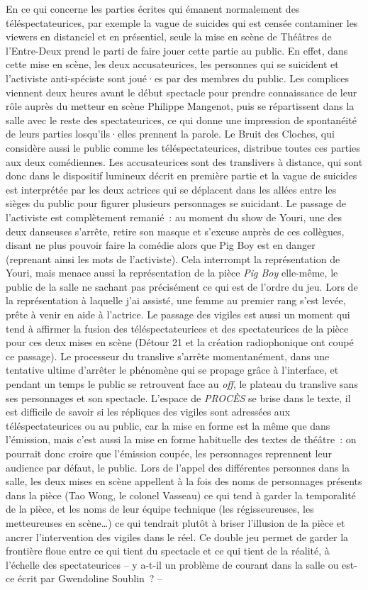 \documentclass[
]{article}
\begin{document}
En ce qui concerne les parties écrites qui émanent normalement des téléspectateurices, par exemple la vague de suicides qui est censée contaminer les viewers en distanciel et en présentiel, seule la mise en scène de Théâtres de l'Entre-Deux prend le parti de faire jouer cette partie au public. En effet, dans cette mise en scène, les deux accusateurices, les personnes qui se suicident et l'activiste anti-spéciste sont joué·es par des membres du public. Les complices viennent deux heures avant le début spectacle pour prendre connaissance de leur rôle auprès du metteur en scène Philippe Mangenot, puis se répartissent dans la salle avec le reste des spectateurices, ce qui donne une impression de spontanéité de leurs parties losqu'ils·elles prennent la parole. Le Bruit des Cloches, qui considère aussi le public comme les téléspectateurices, distribue toutes ces parties aux deux comédiennes. Les accusateurices sont des translivers à distance, qui sont donc dans le dispositif lumineux décrit en première partie et la vague de suicides est interprétée par les deux actrices qui se déplacent dans les allées entre les sièges du public pour figurer plusieurs personnages se suicidant. Le passage de l'activiste est complètement remanié~: au moment du show de Youri, une des deux danseuses s'arrête, retire son masque et s'excuse auprès de ces collègues, disant ne plus pouvoir faire la comédie alors que Pig Boy est en danger (reprenant ainsi les mots de l'activiste). Cela interrompt la représentation de Youri, mais menace aussi la représentation de la pièce \emph{Pig Boy} elle-même, le public de la salle ne sachant pas précisément ce qui est de l'ordre du jeu. Lors de la représentation à laquelle j'ai assisté, une femme au premier rang s'est levée, prête à venir en aide à l'actrice. Le passage des vigiles est aussi un moment qui tend à affirmer la fusion des téléspectateurices et des spectateurices de la pièce pour ces deux mises en scène (Détour 21 et la création radiophonique ont coupé ce passage). Le processeur du translive s'arrête momentanément, dans une tentative ultime d'arrêter le phénomène qui se propage grâce à l'interface, et pendant un temps le public se retrouvent face au \emph{off}, le plateau du translive sans ses personnages et son spectacle. L'espace de \emph{PROCÈS} se brise dans le texte, il est difficile de savoir si les répliques des vigiles sont adressées aux téléspectateurices ou au public, car la mise en forme est la même que dans l'émission, mais c'est aussi la mise en forme habituelle des textes de théâtre~: on pourrait donc croire que l'émission coupée, les personnages reprennent leur audience par défaut, le public. Lors de l'appel des différentes personnes dans la salle, les deux mises en scène appellent à la fois des noms de personnages présents dans la pièce (Tao Wong, le colonel Vasseau) ce qui tend à garder la temporalité de la pièce, et les noms de leur équipe technique (les régisseureuses, les metteureuses en scène\ldots) ce qui tendrait plutôt à briser l'illusion de la pièce et ancrer l'intervention des vigiles dans le réel. Ce double jeu permet de garder la frontière floue entre ce qui tient du spectacle et ce qui tient de la réalité, à l'échelle des spectateurices -- y a-t-il un problème de courant dans la salle ou est-ce écrit par Gwendoline Soublin~? -- 
\end{document}
